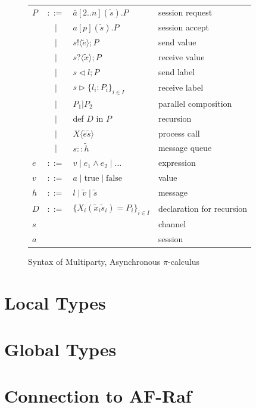 \documentclass[a4paper,12pt,oneside,fleqn]{book} %
\begin{document}
\begin{figure} %
\begin{center}
\begin{tabular}{lcll}
  $P$ & $::=$ & $\bar{a}[2..n](\tilde{s}).P$ & session request
  \\  & $\mid$ & $a[p](\tilde{s}).P$  & session accept
  \\ & $\mid$  & $s!\langle\tilde{e}\rangle;P$ & send value
  \\ & $\mid$ & $s?\langle\tilde{x}\rangle;P$ & receive value
  \\ & $\mid$ & $s \triangleleft l; P$ & send label
  \\ & $\mid$ & $s \triangleright \{l_i:P_i\}_{i\in I}$ & receive label
  \\ & $\mid$ & $P_1|P_2$ & parallel composition
  \\ & $\mid$ & def $D$ in $P$ & recursion
  \\ & $\mid$ & $X\langle\tilde{e}\tilde{s}\rangle$ & process call
  \\ & $\mid$ & $s :: \tilde{h}$ & message queue
  \\
  $e$ & $::=$ & $v \mid e_1 \land e_2 \mid \ldots$ & expression
  \\
  $v$ & $::=$ & $a \mid \text{true} \mid \text{false}$ & value
  \\
  $h$ & $::=$ & $l \mid \tilde{v} \mid \tilde{s}$ & message
  \\
  $D$ & $::=$ & $\{X_i(\tilde{x}_i\tilde{s}_i)=P_i\}_{i\in I}$
    & declaration for recursion
  \\
  $s$ & & & channel
  \\
  $a$ & & & session
\end{tabular}
\end{center}
\caption{Syntax of Multiparty, Asynchronous $\pi$-calculus}
\label{fig:pi-calculus}
\end{figure} %




\section{Local Types}
\label{sec:mast-local}

\section{Global Types}
\label{sec:mast-global}

\section{Connection to AF-Raf}
\label{sec:mast-vs-afraf}
\end{document}
